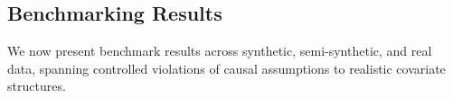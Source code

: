 \subsection{Benchmarking Results}

We now present benchmark results across synthetic, semi-synthetic, and real data, spanning controlled violations of causal assumptions to realistic covariate structures. 

